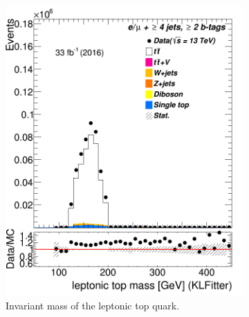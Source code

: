 \begin{figure}
\begin{subfigure}{0.25\textwidth}
		\includegraphics[width=\linewidth]{ControlPlots_emujets_2016_4incl_2incl/klf_topLep_m_emujets_2016.png}
		\caption{ Invariant mass of the leptonic top quark.} \label{fig:K16}
	\end{subfigure}\hspace*{0.25cm}
	\begin{subfigure}{0.25\textwidth}

\end{subfigure}
\end{figure}
